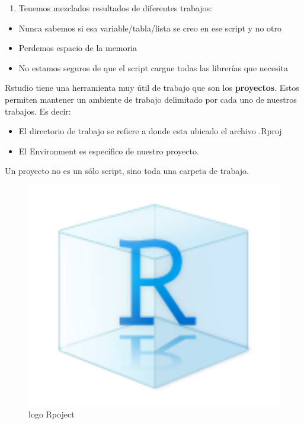 \documentclass[]{book}
\providecommand{\tightlist}{%
  \setlength{\itemsep}{0pt}\setlength{\parskip}{0pt}}
\begin{document}
\begin{enumerate}
\def\labelenumi{\arabic{enumi}.}
\setcounter{enumi}{1}
\tightlist
\item
  Tenemos mezclados resultados de diferentes trabajos:
\end{enumerate}

\begin{itemize}
\tightlist
\item
  Nunca sabemos si esa variable/tabla/lista se creo en ese script y no otro
\item
  Perdemos espacio de la memoria
\item
  No estamos seguros de que el script cargue todas las librerías que necesita
\end{itemize}

Rstudio tiene una herramienta muy útil de trabajo que son los \textbf{proyectos}. Estos permiten mantener un ambiente de trabajo delimitado por cada uno de nuestros trabajos. Es decir:

\begin{itemize}
\tightlist
\item
  El directorio de trabajo se refiere a donde esta ubicado el archivo .Rproj
\item
  El Environment es específico de nuestro proyecto.
\end{itemize}

Un proyecto no es un sólo script, sino toda una carpeta de trabajo.

\begin{figure}
\centering
\includegraphics[width=5.20833in,height=\textheight]{img/Rproject.png}
\caption{logo Rpoject}
\end{figure}
\end{document}
